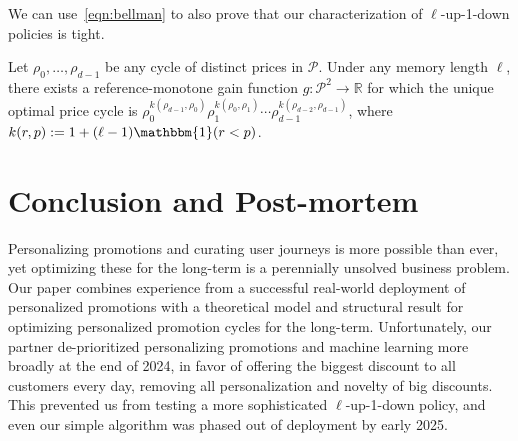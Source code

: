 \documentclass[format=acmsmall, review=false]{acmart}
\newcommand{\bI}{\mathbbm{1}}
\newcommand{\bR}{\mathbb{R}}
\newcommand{\cP}{\mathcal{P}}
\newcommand{\luid}{$\ell$-up-1-down\xspace}
\begin{document}
We can use~\eqref{eqn:bellman} to also prove that our characterization of \luid policies is tight.

\begin{theorem} \label{thm:tightness}
Let $\rho_0,\ldots,\rho_{d-1}$ be any cycle of distinct prices in $\cP$.
Under any memory length $\ell$, there exists a reference-monotone gain function $g:\cP^2\to\bR$ for which the unique optimal price cycle is $\rho_0^{k(\rho_{d-1},\rho_0)}\rho_1^{k(\rho_{0},\rho_1)}\cdots\rho_{d-1}^{k(\rho_{d-2},\rho_{d-1})}$, where $k(r,p):=1+(\ell-1)\bI(r<p)$.    
\end{theorem}

\section{Conclusion and Post-mortem}

Personalizing promotions and curating user journeys is more possible than ever, yet optimizing these for the long-term is a perennially unsolved business problem.
Our paper combines experience from a successful real-world deployment of personalized promotions with a theoretical model and structural result for optimizing personalized promotion cycles for the long-term.
Unfortunately, our partner de-prioritized personalizing promotions and machine learning more broadly at the end of 2024, in favor of offering the biggest discount to all customers every day, removing all personalization and novelty of big discounts.
This prevented us from testing a more sophisticated \luid policy, and even our simple algorithm was phased out of deployment by early 2025.

%
%
%
%
%

\clearpage



\appendix
\end{document}
